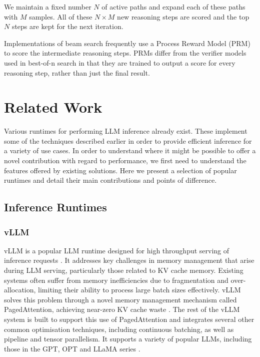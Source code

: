 \documentclass[12pt,twoside]{report}
\begin{document}
We maintain a fixed number $N$ of active paths and expand each of these paths with $M$ samples. 
All of these $N \times M$ new reasoning steps are scored and the top $N$ steps are kept for the next iteration. 

Implementations of beam search frequently use a Process Reward Model (PRM) to score the intermediate reasoning steps. 
PRMs differ from the verifier models used in best-of-n search in that they are trained to output a score for every reasoning step, rather than just the final result.


\chapter{Related Work}\label{chapter:relatedwork}
Various runtimes for performing LLM inference already exist.
These implement some of the techniques described earlier in order to provide efficient inference for a variety of use cases.
In order to understand where it might be possible to offer a novel contribution with regard to performance, we first need to understand the features offered by existing solutions.
Here we present a selection of popular runtimes and detail their main contributions and points of difference.
\section{Inference Runtimes}\label{section:inferenceruntimes}
\subsection{vLLM}
vLLM is a popular LLM runtime designed for high throughput serving of inference requests \cite{kwon2023efficient}.
It addresses key challenges in memory management that arise during LLM serving, particularly those related to KV cache memory.
Existing systems often suffer from memory inefficiencies due to fragmentation and over-allocation, limiting their ability to process large batch sizes effectively.
vLLM solves this problem through a novel memory management mechanism called PagedAttention, achieving near-zero KV cache waste \cite{kwon2023efficient}.
The rest of the vLLM system is built to support this use of PagedAttention and integrates several other common optimisation techniques, including continuous batching, as well as pipeline and tensor parallelism.
It supports a variety of popular LLMs, including those in the GPT, OPT and LLaMA series \cite{radford2018improving} \cite{zhang2022opt} \cite{touvron2023llama}.
\end{document}
